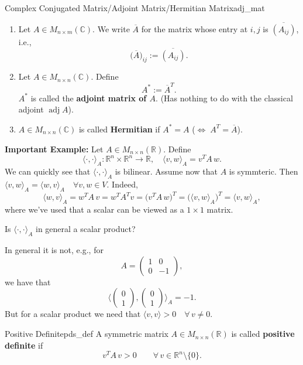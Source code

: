 \begin{definition}{Complex Conjugated Matrix/Adjoint Matrix/Hermitian Matrix}{adj_mat}
	\begin{enumerate}
		\item Let $A \in M_{n \times m}(\mathbb{C})$. We write $\overline{A}$ for the matrix whose entry at $i,j$ is $\overline{(A_{ij})}$, i.e., 
		\[
			\big(\overline{A}\big)_{ij} := \overline{(A_{ij})}.
		\]
		\item Let $A \in M_{n \times n}(\mathbb{C})$. Define 
		\[
			A^{\ast} := \overline{A}^T.
		\]
		$A^{\ast}$ is called the \textbf{adjoint matrix of $A$}. (Has nothing to do with the classical adjoint $\operatorname{adj}A$).
		\item $A \in M_{n\times n}(\mathbb{C})$ is called \textbf{Hermitian} if $A^{\ast} = A$ ($\Longleftrightarrow \; A^T = \overline{A}$).
	\end{enumerate}
\end{definition}

\textbf{Important Example:} Let $A \in M_{n \times n}(\mathbb{R})$. Define 
\[
	\langle \cdot , \cdot \rangle _A : \mathbb{R}^n \times \mathbb{R}^n \to \mathbb{R}, \quad \langle v, w \rangle _A = v^T A \,w.
\]
We can quickly see that $\langle \cdot , \cdot \rangle _A$ is bilinear. Assume now that $A$ is symmteric. Then $\langle v, w \rangle _A = \langle w, v \rangle _A \quad \forall v, w \in V$. Indeed, 
\[
	\langle w, v  \rangle _A = w^T A \, v = w^T A^T v = \big(v^T A \, w\big)^T = \big(\langle v , w \rangle _A\big)^T = \langle v , w \rangle _A,
\]
where we've used that a scalar can be viewed as a $1 \times 1$ matrix.

Is $\langle \cdot , \cdot \rangle _A$ in general a scalar product? 

In general it is not, e.g., for 
\[
	A = \begin{pmatrix}
		1 & 0 \\
		0 & -1
	\end{pmatrix},
\]
we have that
\[
	\langle \begin{pmatrix}
		0\\
		1
	\end{pmatrix}, 
	\begin{pmatrix}
		0 \\
		1
	\end{pmatrix} \rangle _A = -1.
\]
But for a scalar product we need that $\langle v, v \rangle > 0 \quad \forall\, v \neq 0$.

\begin{definition}{Positive Definite}{pds_def}
	A symmetric matrix $A \in M_{n \times n}(\mathbb{R})$ is called \textbf{positive definite} if 
	\[
		v^T A \, v > 0 \qquad \forall \, v \in \mathbb{R}^n \setminus \{0\}.
	\]
\end{definition}

